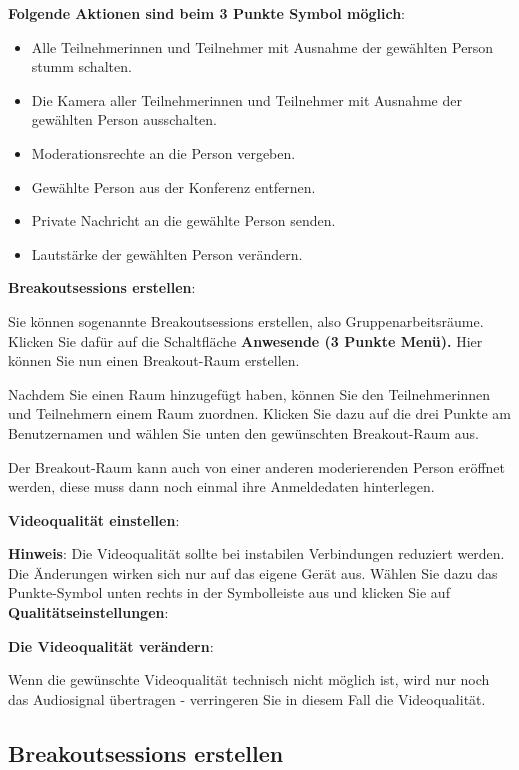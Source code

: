 \documentclass[
  letterpaper,
  DIV=11,
  numbers=noendperiod]{scrreprt}
\providecommand{\tightlist}{%
  \setlength{\itemsep}{0pt}\setlength{\parskip}{0pt}}\usepackage{longtable,booktabs,array}
\begin{document}
\textbf{Folgende Aktionen sind beim 3 Punkte Symbol möglich}:

\begin{itemize}
\tightlist
\item
  Alle Teilnehmerinnen und Teilnehmer mit Ausnahme der gewählten Person
  stumm schalten.
\item
  Die Kamera aller Teilnehmerinnen und Teilnehmer mit Ausnahme der
  gewählten Person ausschalten.
\item
  Moderationsrechte an die Person vergeben.
\item
  Gewählte Person aus der Konferenz entfernen.
\item
  Private Nachricht an die gewählte Person senden.
\item
  Lautstärke der gewählten Person verändern.
\end{itemize}

\textbf{Breakoutsessions erstellen}:

Sie können sogenannte Breakoutsessions erstellen, also
Gruppenarbeitsräume. Klicken Sie dafür auf die Schaltfläche
\textbf{Anwesende (3 Punkte Menü).} Hier können Sie nun einen
Breakout-Raum erstellen.

Nachdem Sie einen Raum hinzugefügt haben, können Sie den Teilnehmerinnen
und Teilnehmern einem Raum zuordnen. Klicken Sie dazu auf die drei
Punkte am Benutzernamen und wählen Sie unten den gewünschten
Breakout-Raum aus.

Der Breakout-Raum kann auch von einer anderen moderierenden Person
eröffnet werden, diese muss dann noch einmal ihre Anmeldedaten
hinterlegen.

\textbf{Videoqualität einstellen}:

\textbf{Hinweis}: Die Videoqualität sollte bei instabilen Verbindungen
reduziert werden. Die Änderungen wirken sich nur auf das eigene Gerät
aus. Wählen Sie dazu das Punkte-Symbol unten rechts in der Symbolleiste
aus und klicken Sie auf \textbf{Qualitätseinstellungen}:

\textbf{Die Videoqualität verändern}:

Wenn die gewünschte Videoqualität technisch nicht möglich ist, wird nur
noch das Audiosignal übertragen - verringeren Sie in diesem Fall die
Videoqualität.

\subsection{Breakoutsessions
erstellen}\label{breakoutsessions-erstellen}
\end{document}
